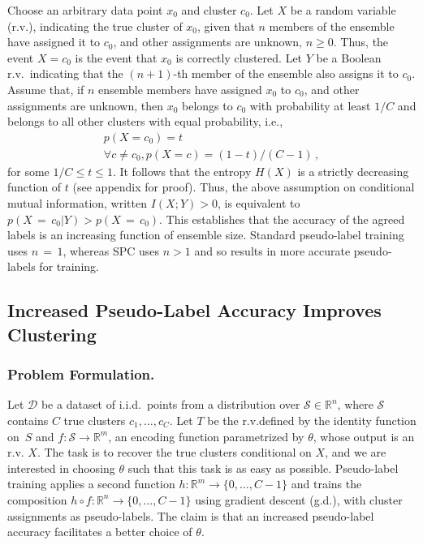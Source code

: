 \documentclass[runningheads]{llncs}
\begin{document}
Choose an arbitrary data point $x_0$ and cluster $c_0$. Let $X$ be a random variable (r.v.), indicating the true cluster of $x_0$, given that $n$ members of the ensemble have assigned it to $c_0$, and other assignments are unknown, $n\geq 0$. Thus, the event $X=c_0$ is the event that $x_0$ is correctly clustered. Let $Y$ be a Boolean r.v.\ indicating that the \mbox{$(n+1)$-th} member of the ensemble also assigns it to $c_0$. Assume that, if $n$ ensemble members have assigned $x_0$ to $c_0$, and other assignments are unknown, then $x_0$ belongs to $c_0$ with probability at least $1/C$ and belongs to all other clusters with equal probability, i.e.,  
\begin{gather*}
    p(X=c_0) = t \\
    \forall c \neq c_0, p(X=c) = {(1-t)}/{(C-1)}\,,
\end{gather*}
for some $1/C \leq t \leq 1$. 
It follows that the entropy $H(X)$ is a strictly decreasing function of $t$ (see appendix for proof). 
Thus, the above assumption on conditional mutual information, written $I(X;Y) > 0$, is equivalent to $p(X\,{=}\,c_0 | Y) > p(X\,{=}\,c_0)$. This establishes that the accuracy of the agreed labels is an increasing function of ensemble size. Standard pseudo-label training uses $n\,{=}\,1$, whereas SPC uses $n>1$ and so results in more accurate pseudo-labels for training.


\subsection{Increased Pseudo-Label Accuracy Improves Clustering}


\subsubsection{Problem Formulation.}
Let $\mathcal{D}$ be a dataset of i.i.d.~points from a distribution over $\mathcal{S} \in \mathbb{R}^n$, where $\mathcal{S}$ contains $C$ true clusters $c_1, \dots, c_C$. Let $T$ be the r.v.defined by the identity function on~$S$ and $f:\mathcal{S} \rightarrow \mathbb{R}^m$, an encoding function parametrized by $\theta$, whose output is an r.v. $X$. The task is to recover the true clusters conditional on $X$, and we are interested in choosing $\theta$ such that this task is as easy as possible. Pseudo-label training applies a second function $h: \mathbb{R}^m \rightarrow \{0, \dots, C-1\}$ and trains the composition $h \circ f: \mathbb{R}^n \rightarrow  \{0, \dots, C-1\}$ using gradient descent (g.d.), with cluster assignments as pseudo-labels. The claim is that an increased pseudo-label accuracy facilitates a better choice of $\theta$. 
\end{document}
